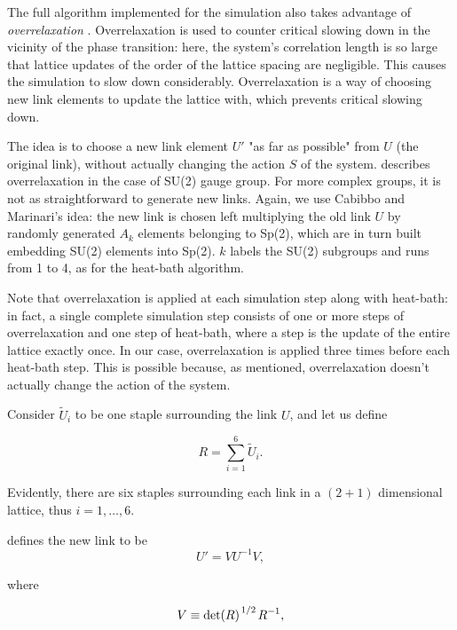 \documentclass[reqno,12pt]{article}
\numberwithin{equation}{section}
\begin{document}
The full algorithm implemented for the simulation also takes advantage of \textit{overrelaxation} \cite{montvay}.
Overrelaxation is used to counter critical slowing down in the vicinity of the phase transition: here,
the system's correlation length is so large that lattice updates of the order of the lattice spacing are
negligible. This causes the simulation to slow down considerably. 
Overrelaxation is a way of choosing new link elements to update the lattice with, which prevents critical
slowing down. 

The idea is to choose a new link element $U'$ "as far as possible" from $U$ (the original link), without actually changing the
action $S$ of the system. \cite{montvay} describes overrelaxation in the case of SU(2) gauge group. For more
complex groups, it is not as straightforward to generate new links. Again, we use Cabibbo and Marinari's idea:
the new link is chosen left multiplying the old link $U$ by randomly generated $A_k$ elements belonging
to Sp(2), which are in turn built embedding SU(2) elements into Sp(2). $k$ labels the SU(2) subgroups and runs
from 1 to 4, as for the heat-bath algorithm. 

Note that overrelaxation is applied at each simulation step along with heat-bath: in fact,
a single complete simulation step consists of one or more steps of overrelaxation and one step of heat-bath, where
a step is the update of the entire lattice exactly once. In our case, overrelaxation is applied three times
before each heat-bath step. This is possible because, as mentioned, overrelaxation doesn't actually change
the action of the system.

Consider $\widetilde{U}_i$ to be one staple surrounding the link $U$, and let us define

\begin{equation}
	R = \sum_{i = 1}^6 \widetilde{U}_i.
\end{equation}

Evidently, there are six staples surrounding each link in a $(2+1)$ dimensional lattice, thus $i = 1,\dots,6$.

\cite{montvay} defines the new link to be
\begin{equation}
	U' = V U^{-1} V,
\end{equation}

where 

\begin{equation}
	V \equiv \det(R)^{\flatfrac{1}{2}} R^{-1},
\end{equation}
\end{document}

